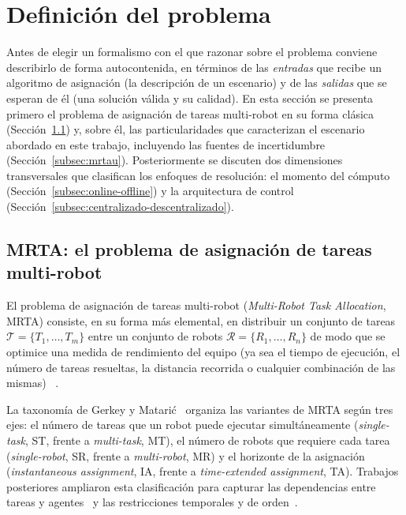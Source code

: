 \section{Definición del problema} \label{sec:definicion} %

Antes de elegir un formalismo con el que razonar sobre el problema conviene describirlo de forma autocontenida, en términos de las \emph{entradas} que recibe un algoritmo de asignación (la descripción de un escenario) y de las \emph{salidas} que se esperan de él (una solución válida y su calidad). En esta sección se presenta primero el problema de asignación de tareas multi-robot en su forma clásica (Sección~\ref{subsec:mrta}) y, sobre él, las particularidades que caracterizan el escenario abordado en este trabajo, incluyendo las fuentes de incertidumbre (Sección~\ref{subsec:mrtau}). Posteriormente se discuten dos dimensiones transversales que clasifican los enfoques de resolución: el momento del cómputo (Sección~\ref{subsec:online-offline}) y la arquitectura de control (Sección~\ref{subsec:centralizado-descentralizado}).


\subsection{MRTA: el problema de asignación de tareas multi-robot} \label{subsec:mrta} %

El problema de asignación de tareas multi-robot (\textit{Multi-Robot Task Allocation}, MRTA) consiste, en su forma más elemental, en distribuir un conjunto de tareas $\mathcal{T}=\{T_1,\dots,T_m\}$ entre un conjunto de robots $\mathcal{R}=\{R_1,\dots,R_n\}$ de modo que se optimice una medida de rendimiento del equipo (ya sea el tiempo de ejecución, el número de tareas resueltas, la distancia recorrida o cualquier combinación de las mismas) ~\cite{gerkey2004taxonomy}. 

La taxonomía de Gerkey y Matarić~\cite{gerkey2004taxonomy} organiza las variantes de MRTA según tres ejes: el número de tareas que un robot puede ejecutar simultáneamente (\textit{single-task}, ST, frente a \textit{multi-task}, MT), el número de robots que requiere cada tarea (\textit{single-robot}, SR, frente a \textit{multi-robot}, MR) y el horizonte de la asignación (\textit{instantaneous assignment}, IA, frente a \textit{time-extended assignment}, TA). Trabajos posteriores ampliaron esta clasificación para capturar las dependencias entre tareas y agentes~\cite{korsah2013taxonomy} y las restricciones temporales y de orden~\cite{nunes2017taxonomy}.

